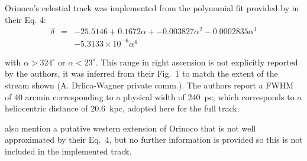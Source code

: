 Orinoco's celestial track was implemented from the polynomial fit provided by \citet{Grillmair2017_south} in their Eq. 4:
\begin{eqnarray*}
\delta &=& -25.5146 + 0.1672\alpha + -0.003827\alpha^2 -0.0002835\alpha^3 \\
       & & -5.3133\times 10^{-6}\alpha^4
\end{eqnarray*}

with $\alpha>324^\circ$ or $\alpha<23^\circ$. This range in right ascension is not explicitly reported by the authors,
it was inferred from their Fig.~1 to match the extent of the stream shown (A. Drlica-Wagner private comm.).
The authors report a FWHM of 40 arcmin corresponding to a physical width of 240~pc, which corresponds to a heliocentric distance of 20.6~kpc, adopted here for the full track.

\citet{Grillmair2017_south} also mention a putative western extension of Orinoco that is not well approximated by their Eq.~4, but no further information is provided so this is not included in the implemented track.
